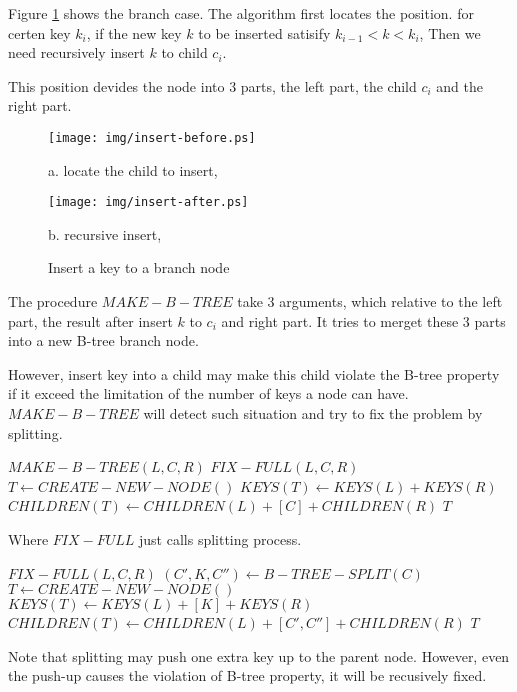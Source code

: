 \documentclass{article}
\begin{document}
Figure \ref{fig:recursive-insert} shows the branch case. The
algorithm first locates the position. for certen key $k_i$,
if the new key $k$ to be inserted satisify $k_{i-1}<k<k_i$,
Then we need recursively insert $k$ to child $c_i$.

This position devides the node into 3 parts, the left part,
the child $c_i$ and the right part.

\begin{figure}[htbp]
       \begin{center}
       	  \texttt{[image: img/insert-before.ps]}

          a. locate the child to insert,

          \texttt{[image: img/insert-after.ps]}

          b. recursive insert, 
        \caption{Insert a key to a branch node} \label{fig:recursive-insert}
       \end{center}
\end{figure}

The procedure $MAKE-B-TREE$ take 3 arguments, which relative to
the left part, the result after insert $k$ to $c_i$ and right part. 
It tries to merget these 3 parts into a new B-tree branch node.

However, insert key into a child may make this child violate the
B-tree property if it exceed the limitation of the number of keys
a node can have. $MAKE-B-TREE$ will detect such situation and try
to fix the problem by splitting.

\begin{algorithmic}
\STATE $MAKE-B-TREE(L, C, R)$
    \RETURN $FIX-FULL(L, C, R)$
  \ELSE
    \STATE $T \leftarrow CREATE-NEW-NODE()$
    \STATE $KEYS(T) \leftarrow KEYS(L) + KEYS(R)$
    \STATE $CHILDREN(T) \leftarrow CHILDREN(L)+[C]+CHILDREN(R)$
    \RETURN $T$
  \ENDIF
\end{algorithmic}

Where $FIX-FULL$ just calls splitting process.

\begin{algorithmic}
\STATE $FIX-FULL(L, C, R)$
  \STATE $(C', K, C'') \leftarrow B-TREE-SPLIT(C)$
  \STATE $T \leftarrow CREATE-NEW-NODE()$
  \STATE $KEYS(T) \leftarrow KEYS(L)+[K]+KEYS(R)$
  \STATE $CHILDREN(T) \leftarrow CHILDREN(L)+[C', C'']+CHILDREN(R)$
  \RETURN $T$
\end{algorithmic}

Note that splitting may push one extra key up to the parent node.
However, even the push-up causes the violation of B-tree property,
it will be recusively fixed.
\end{document}
